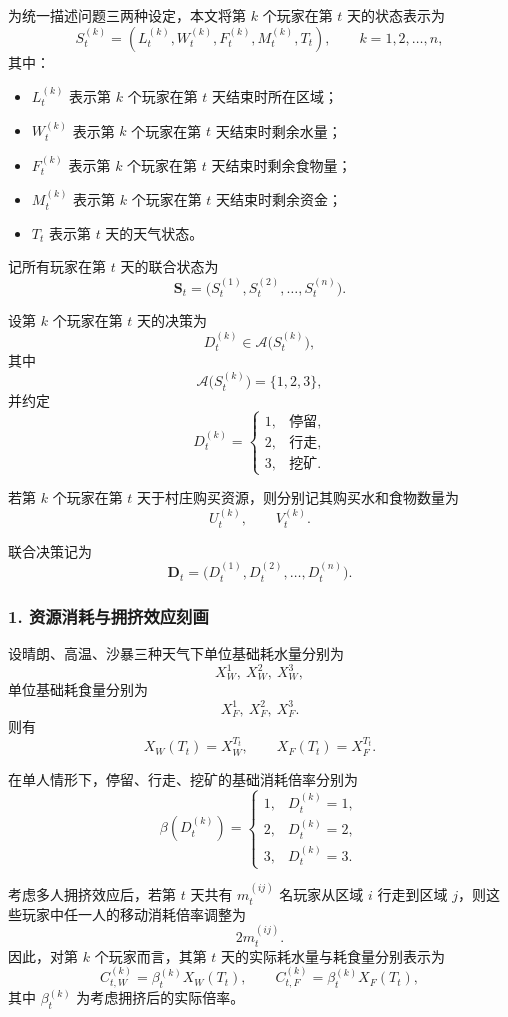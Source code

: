 \documentclass[UTF8,a4paper,12pt]{ctexart}
\begin{document}
为统一描述问题三两种设定，本文将第 $k$ 个玩家在第 $t$ 天的状态表示为
\[
S_t^{(k)}=(L_t^{(k)},W_t^{(k)},F_t^{(k)},M_t^{(k)},T_t),
\qquad k=1,2,\dots,n,
\]
其中：
\begin{itemize}
    \item $L_t^{(k)}$ 表示第 $k$ 个玩家在第 $t$ 天结束时所在区域；
    \item $W_t^{(k)}$ 表示第 $k$ 个玩家在第 $t$ 天结束时剩余水量；
    \item $F_t^{(k)}$ 表示第 $k$ 个玩家在第 $t$ 天结束时剩余食物量；
    \item $M_t^{(k)}$ 表示第 $k$ 个玩家在第 $t$ 天结束时剩余资金；
    \item $T_t$ 表示第 $t$ 天的天气状态。
\end{itemize}

记所有玩家在第 $t$ 天的联合状态为
\[
\mathbf{S}_t=\bigl(S_t^{(1)},S_t^{(2)},\dots,S_t^{(n)}\bigr).
\]

设第 $k$ 个玩家在第 $t$ 天的决策为
\[
D_t^{(k)}\in\mathcal{A}\bigl(S_t^{(k)}\bigr),
\]
其中
\[
\mathcal{A}\bigl(S_t^{(k)}\bigr)=\{1,2,3\},
\]
并约定
\[
D_t^{(k)}=
\begin{cases}
1, & \text{停留},\\
2, & \text{行走},\\
3, & \text{挖矿}.
\end{cases}
\]

若第 $k$ 个玩家在第 $t$ 天于村庄购买资源，则分别记其购买水和食物数量为
\[
U_t^{(k)},\qquad V_t^{(k)}.
\]

联合决策记为
\[
\mathbf{D}_t=\bigl(D_t^{(1)},D_t^{(2)},\dots,D_t^{(n)}\bigr).
\]

\subsubsection*{1. 资源消耗与拥挤效应刻画}

设晴朗、高温、沙暴三种天气下单位基础耗水量分别为
\[
X_W^1,\ X_W^2,\ X_W^3,
\]
单位基础耗食量分别为
\[
X_F^1,\ X_F^2,\ X_F^3.
\]
则有
\[
X_W(T_t)=X_W^{T_t},\qquad X_F(T_t)=X_F^{T_t}.
\]

在单人情形下，停留、行走、挖矿的基础消耗倍率分别为
\[
\beta(D_t^{(k)})=
\begin{cases}
1, & D_t^{(k)}=1,\\
2, & D_t^{(k)}=2,\\
3, & D_t^{(k)}=3.
\end{cases}
\]

考虑多人拥挤效应后，若第 $t$ 天共有 $m_t^{(ij)}$ 名玩家从区域 $i$ 行走到区域 $j$，则这些玩家中任一人的移动消耗倍率调整为
\[
2m_t^{(ij)}.
\]
因此，对第 $k$ 个玩家而言，其第 $t$ 天的实际耗水量与耗食量分别表示为
\[
C_{t,W}^{(k)}=\beta_t^{(k)} X_W(T_t),
\qquad
C_{t,F}^{(k)}=\beta_t^{(k)} X_F(T_t),
\]
其中 $\beta_t^{(k)}$ 为考虑拥挤后的实际倍率。
\end{document}
